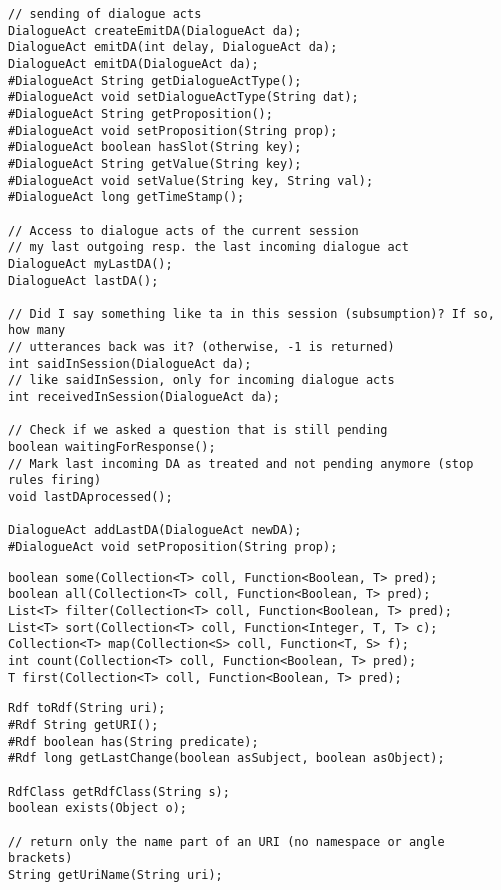 \begin{small}
\begin{lstlisting}
// sending of dialogue acts
DialogueAct createEmitDA(DialogueAct da);
DialogueAct emitDA(int delay, DialogueAct da);
DialogueAct emitDA(DialogueAct da);
#DialogueAct String getDialogueActType();
#DialogueAct void setDialogueActType(String dat);
#DialogueAct String getProposition();
#DialogueAct void setProposition(String prop);
#DialogueAct boolean hasSlot(String key);
#DialogueAct String getValue(String key);
#DialogueAct void setValue(String key, String val);
#DialogueAct long getTimeStamp();

// Access to dialogue acts of the current session
// my last outgoing resp. the last incoming dialogue act
DialogueAct myLastDA();
DialogueAct lastDA();

// Did I say something like ta in this session (subsumption)? If so, how many
// utterances back was it? (otherwise, -1 is returned)
int saidInSession(DialogueAct da);
// like saidInSession, only for incoming dialogue acts
int receivedInSession(DialogueAct da);

// Check if we asked a question that is still pending
boolean waitingForResponse();
// Mark last incoming DA as treated and not pending anymore (stop rules firing)
void lastDAprocessed();

DialogueAct addLastDA(DialogueAct newDA);
#DialogueAct void setProposition(String prop);
\end{lstlisting}
\end{small}

\begin{small}
\begin{lstlisting}
boolean some(Collection<T> coll, Function<Boolean, T> pred);
boolean all(Collection<T> coll, Function<Boolean, T> pred);
List<T> filter(Collection<T> coll, Function<Boolean, T> pred);
List<T> sort(Collection<T> coll, Function<Integer, T, T> c);
Collection<T> map(Collection<S> coll, Function<T, S> f);
int count(Collection<T> coll, Function<Boolean, T> pred);
T first(Collection<T> coll, Function<Boolean, T> pred);
\end{lstlisting}
\end{small}

\begin{small}
\begin{lstlisting}
Rdf toRdf(String uri);
#Rdf String getURI();
#Rdf boolean has(String predicate);
#Rdf long getLastChange(boolean asSubject, boolean asObject);

RdfClass getRdfClass(String s);
boolean exists(Object o);

// return only the name part of an URI (no namespace or angle brackets)
String getUriName(String uri);
\end{lstlisting}
\end{small}


